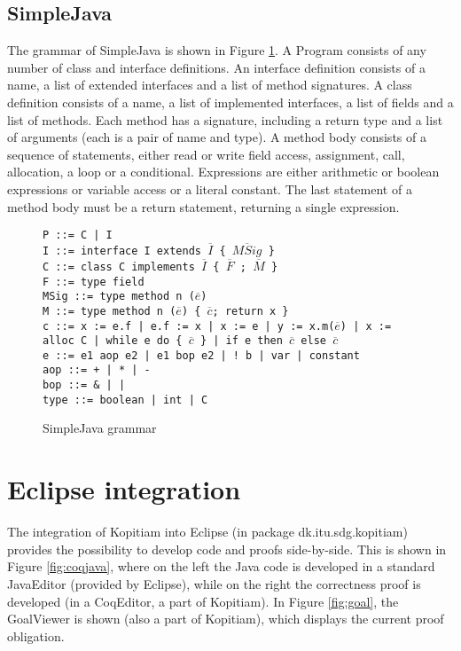 \documentclass{article}
\begin{document}
\subsection{SimpleJava} \label{subsection:simplejava}
The grammar of SimpleJava is shown in Figure \ref{fig:simplejava}. A Program consists of any number of class and interface definitions. An interface definition consists of a name, a list of extended interfaces and a list of method signatures. A class definition consists of a name, a list of implemented interfaces, a list of fields and a list of methods. Each method has a signature, including a return type and a list of arguments (each is a pair of name and type). A method body consists of a sequence of statements, either read or write field access, assignment, call, allocation, a loop or a conditional. Expressions are either arithmetic or boolean expressions or variable access or a literal constant. The last statement of a method body must be a return statement, returning a single expression.

\begin{figure}
\texttt{P ::= C | I}\\
\texttt{I ::= interface I extends $\overline{I}$ \{ $\overline{MSig}$ \}}\\
\texttt{C ::= class C implements $\overline{I}$ \{ $\overline{F}$ ; $\overline{M}$ \}}\\
\texttt{F ::= type field}\\
\texttt{MSig ::= type method n ($\overline{e}$)}\\
\texttt{M ::= type method n ($\overline{e}$) \{ $\overline{c}$; return x \}}\\
\texttt{c ::= x := e.f | e.f := x | x := e | y := x.m($\overline{e}$) | x := alloc C | while e do \{ $\overline{c}$ \} | if e then $\overline{c}$ else $\overline{c}$}\\
\texttt{e ::= e1 aop e2 | e1 bop e2 | ! b | var | constant}\\
\texttt{aop ::= + | * | -}\\
\texttt{bop ::= \& | |}\\
\texttt{type ::= boolean | int | C}\\
\caption{SimpleJava grammar}
\label{fig:simplejava}
\end{figure}

\section{Eclipse integration} \label{section:eclipse}
The integration of Kopitiam into Eclipse (in package dk.itu.sdg.kopitiam) provides the possibility to develop code and proofs side-by-side. This is shown in Figure \ref{fig:coqjava}, where on the left the Java code is developed in a standard JavaEditor (provided by Eclipse), while on the right the correctness proof is developed (in a CoqEditor, a part of Kopitiam). In Figure \ref{fig:goal}, the GoalViewer is shown (also a part of Kopitiam), which displays the current proof obligation.
\end{document}
